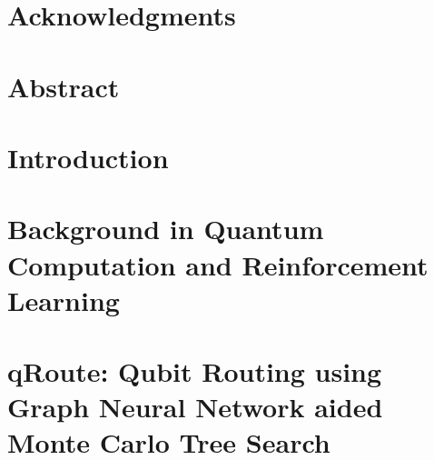 \documentclass[11pt]{book}
\renewcommand{\baselinestretch}{1.2}
\begin{document}



\newpage
\thispagestyle{empty}
\renewcommand{\thesisdedication}{{\large Copyright \copyright~~Animesh Sinha, 2022\\}{\large All Rights Reserved\\}}
\thesisdedicationpage



\newpage
\thispagestyle{empty}
\renewcommand{\thesisdedication}{\large To Compute}
\thesisdedicationpage

\mastersthesis
\renewcommand{\baselinestretch}{1.5}

\chapter*{Acknowledgments}
\label{ch:ack}


\chapter*{Abstract}
\label{ch:abstract}


\tableofcontents
\listoffigures
\listoftables


\chapter{Introduction}
\label{ch:intro}



\chapter{Background in Quantum Computation and Reinforcement Learning}
\label{ch:background}



\chapter{qRoute: Qubit Routing using Graph Neural Network aided Monte Carlo Tree Search}
\label{ch:qroute}

\end{document}
